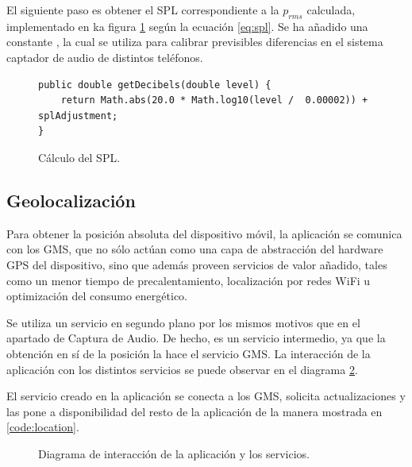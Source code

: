 El siguiente paso es obtener el \ac{SPL} correspondiente a la $p_{rms}$ calculada, implementado en ka figura \ref{code:spl} según la ecuación \ref{eq:spl}. Se ha añadido una constante , la cual se utiliza para calibrar previsibles diferencias en el sistema captador de audio de distintos teléfonos.

\begin{figure}[h] 
\begin{verbatim}
public double getDecibels(double level) {
    return Math.abs(20.0 * Math.log10(level /  0.00002)) + splAdjustment;
}
\end{verbatim}
\caption{Cálculo del SPL.}
\label{code:spl}
\end{figure}

\subsection{Geolocalización}
\label{sec:impl:geo}
Para obtener la posición absoluta del dispositivo móvil, la aplicación se comunica con los \ac{GMS}, que no sólo actúan como una capa de abstracción del hardware GPS del dispositivo, sino que además proveen servicios de valor añadido, tales como un menor tiempo de precalentamiento, localización por redes WiFi u optimización del consumo energético.

Se utiliza un servicio en segundo plano por los mismos motivos que en el apartado de Captura de Audio. De hecho, es un servicio intermedio, ya que la obtención en sí de la posición la hace el servicio \ac{GMS}. La interacción de la aplicación con los distintos servicios se puede observar en el diagrama \ref{fig:diagrama:servicios}.

El servicio creado en la aplicación se conecta a los \ac{GMS}, solicita actualizaciones y las pone a disponibilidad del resto de la aplicación de la manera mostrada en \ref{code:location}.

\begin{figure}[h] \centering
{}
\caption{Diagrama de interacción de la aplicación y los servicios.}\label{fig:diagrama:servicios}
\end{figure}


